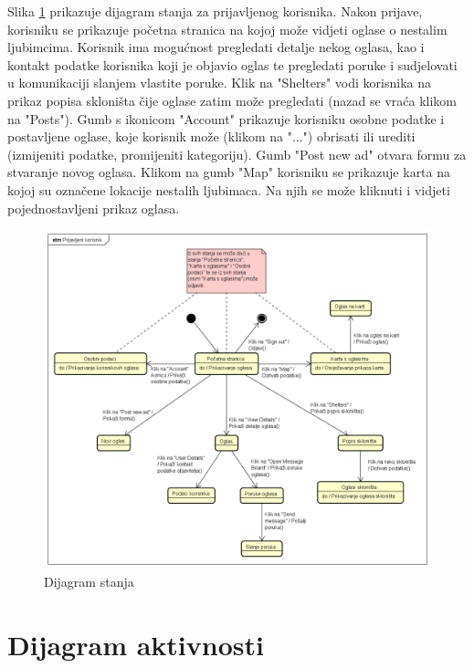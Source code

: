 			Slika \ref{dijagram_stanja} prikazuje dijagram stanja za prijavljenog korisnika. Nakon prijave, korisniku se prikazuje početna stranica na kojoj može vidjeti oglase o nestalim ljubimcima. Korisnik ima mogućnost pregledati detalje nekog oglasa, kao i kontakt podatke korisnika koji je objavio oglas te pregledati poruke i sudjelovati u komunikaciji slanjem vlastite poruke. Klik na "Shelters" vodi korisnika na prikaz popisa skloništa čije oglase zatim može pregledati (nazad se vraća klikom na "Posts"). Gumb s ikonicom "Account" prikazuje korisniku osobne podatke i postavljene oglase, koje korisnik može (klikom na "...") obrisati ili urediti (izmijeniti podatke, promijeniti kategoriju). Gumb "Post new ad" otvara formu za stvaranje novog oglasa. Klikom na gumb "Map" korisniku se prikazuje karta na kojoj su označene lokacije nestalih ljubimaca. Na njih se može kliknuti i vidjeti pojednostavljeni prikaz oglasa.
			
			\begin{figure}[H]
				\includegraphics[scale=0.5]{slike/dijagram_stanja.PNG} 
				\centering
				\caption{Dijagram stanja}
				\label{dijagram_stanja}
			\end{figure}
			
			
			\eject 
		
		\section{Dijagram aktivnosti}
			
